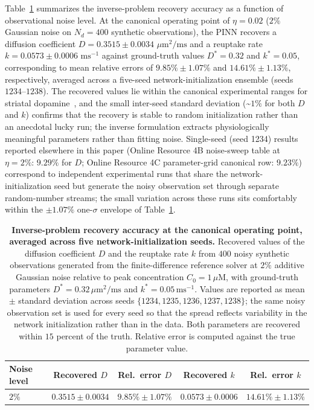 \documentclass[12pt]{article}
\begin{document}
Table~\ref{tab:inverse} summarizes the inverse-problem recovery
accuracy as a function of observational noise level. At the
canonical operating point of $\eta = 0.02$ ($2\%$ Gaussian
noise on $N_d = 400$ synthetic observations), the PINN recovers
a diffusion coefficient $D = 0.3515 \pm 0.0034$
$\mu\text{m}^2/\text{ms}$ and a reuptake rate
$k = 0.0573 \pm 0.0006$ $\text{ms}^{-1}$ against ground-truth
values $D^* = 0.32$ and $k^* = 0.05$, corresponding to mean
relative errors of $9.85\% \pm 1.07\%$ and $14.61\% \pm 1.13\%$,
respectively, averaged across a five-seed network-initialization
ensemble (seeds $1234$--$1238$). The recovered values lie within
the canonical experimental ranges for striatal
dopamine~\cite{CraggRice2004, Nicholson1981}, and the small
inter-seed standard deviation (\textasciitilde$1\%$ for both $D$
and $k$) confirms that the recovery is stable to random
initialization rather than an anecdotal lucky run; the
inverse formulation extracts physiologically meaningful
parameters rather than fitting noise. Single-seed (seed 1234) results reported elsewhere in this paper
(Online Resource 4B noise-sweep table at $\eta = 2\%$: $9.29\%$
for $D$; Online Resource 4C parameter-grid canonical row:
$9.23\%$) correspond to independent experimental runs that share
the network-initialization seed but generate the noisy
observation set through separate random-number streams; the
small variation across these runs sits comfortably within the
$\pm 1.07\%$ one-$\sigma$ envelope of Table~\ref{tab:inverse}.

\begin{table}[h!]
\centering
\caption{\textbf{Inverse-problem recovery accuracy at the
canonical operating point, averaged across five
network-initialization seeds.}
Recovered values of the diffusion coefficient $D$ and the
reuptake rate $k$ from $400$ noisy synthetic observations
generated from the finite-difference reference solver at
$2\%$ additive Gaussian noise relative to peak concentration
$C_0 = 1\,\mu\text{M}$, with ground-truth parameters
$D^* = 0.32\,\mu\text{m}^2/\text{ms}$ and
$k^* = 0.05\,\text{ms}^{-1}$. Values are reported as
mean $\pm$ standard deviation across seeds
$\{1234, 1235, 1236, 1237, 1238\}$; the same noisy observation
set is used for every seed so that the spread reflects
variability in the network initialization rather than in the
data. Both parameters are recovered within $15$ percent of
the truth. Relative error is computed against the true
parameter value.}
\label{tab:inverse}
\begin{tabular}{lcccc}
\toprule
\textbf{Noise level} & \textbf{Recovered $D$} & \textbf{Rel.\ error $D$}
& \textbf{Recovered $k$} & \textbf{Rel.\ error $k$} \\
\midrule
$2\%$    & $0.3515 \pm 0.0034$ & $9.85\% \pm 1.07\%$
         & $0.0573 \pm 0.0006$ & $14.61\% \pm 1.13\%$ \\
\bottomrule
\end{tabular}
\end{table}
\end{document}
